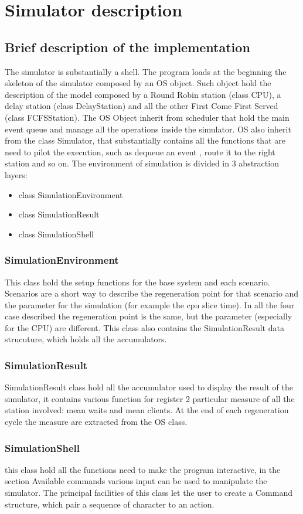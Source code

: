 \documentclass[12pt,a4paper]{article}
\begin{document}
\section{Simulator description}
\subsection{Brief description of the implementation}
The simulator is substantially a shell. The program loads at the beginning the skeleton of the simulator composed by an OS object. Such object hold the description of the model composed by a Round Robin station (class CPU), a delay station (class DelayStation) and all the other First Come First Served (class FCFSStation). The OS Object inherit from scheduler that hold the main event queue and manage all the operations inside the simulator. OS also inherit from the class Simulator, that substantially contains all the functions that are need to pilot the execution, such as dequeue an event , route it to the right station and so on. The environment of simulation is divided in 3 abstraction layers:
\begin{itemize}
    \item class SimulationEnvironment
    \item class SimulationResult
    \item class SimulationShell
\end{itemize}
\subsubsection{SimulationEnvironment}
This class hold the setup functions for the base system and each scenario. Scenarios are a short way to describe the regeneration point for that scenario and the parameter for the simulation (for example the cpu slice time). In all the four case described the regeneration point is the same, but the parameter (especially for the CPU) are different. This class also contains the SimulationResult data strucuture, which holds all the accumulators.
\subsubsection{SimulationResult}
SimulationResult class hold all the accumulator used to display the result of the simulator, it contains various function for register 2 particular measure of all the station involved: mean waits and mean clients. At the end of each regeneration cycle the measure are extracted from the OS class.
\subsubsection{SimulationShell}
this class hold all the functions need to make the program interactive, in the section Available commands various input can be used to manipulate the simulator. The principal facilities of this class let the user to create a Command structure, which pair a sequence of character to an action.
\end{document}
